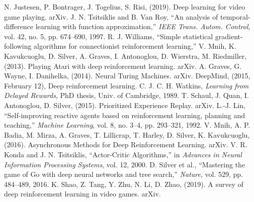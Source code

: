\documentclass[conference]{IEEEtran}
\begin{document}
\begin{thebibliography}{00}
     N. Justesen, P. Bontrager, J. Togelius, S. Risi, (2019). Deep learning for video game playing. arXiv.
     J. N. Tsitsiklis and B. Van Roy, “An analysis of temporal-difference learning with function approximation,” \textit{IEEE Trans. Autom. Control}, vol. 42, no. 5, pp. 674–690, 1997.
     R. J. Williams, “Simple statistical gradient-following algorithms for connectionist reinforcement learning,”
      V. Mnih, K. Kavukcuoglu, D. Silver, A. Graves, I. Antonoglou, D. Wierstra, M. Riedmiller, (2013). Playing Atari with deep reinforcement learning. arXiv.
      A. Graves, G. Wayne, I. Danihelka, (2014). Neural Turing Machines. arXiv.
      DeepMind, (2015, February 12), Deep reinforcement learning.
     C. J. C. H. Watkins, \textit{Learning from Delayed Rewards}, PhD thesis, Univ. of Cambridge, 1989.
      T. Schaul, J. Quan, I. Antonoglou, D. Silver, (2015). Prioritized Experience Replay. arXiv.
     L.-J. Lin, “Self-improving reactive agents based on reinforcement learning, planning and teaching,” \textit{Machine Learning}, vol. 8, no. 3–4, pp. 293–321, 1992.
      V. Mnih, A. P. Badia, M. Mirza, A. Graves, T. Lillicrap, T. Harley, D. Silver, K. Kavukcuoglu, (2016). Asynchronous Methods for Deep Reinforcement Learning. arXiv.
     V. R. Konda and J. N. Tsitsiklis, “Actor-Critic Algorithms,” in \textit{Advances in Neural Information Processing Systems}, vol. 12, 2000.
     D. Silver et al., “Mastering the game of Go with deep neural networks and tree search,” \textit{Nature}, vol. 529, pp. 484–489, 2016.
     K. Shao, Z. Tang, Y. Zhu, N. Li, D. Zhao, (2019). A survey of deep reinforcement learning in video games. arXiv.


\end{thebibliography}
\end{document}
